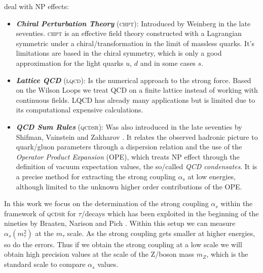 \documentclass[../../index.tex]{subfiles}
\begin{document}
deal with NP effects:
\begin{itemize}
\item \textbf{\textit{Chiral Perturbation Theory}} (\textsc{chpt}): Introduced
  by Weinberg \cite{Weinberg1978} in the late seventies. \textsc{chpt} is an
  effective field theory constructed with a Lagrangian symmetric under a
  chiral\-/transformation in the limit of massless quarks. It's limitations are
  based in the chiral symmetry, which is only a good approximation for the light
  quarks $u$, $d$ and in some cases $s$.
\item \textbf{\textit{Lattice QCD}} (\textsc{lqcd}): Is the numerical approach
  to the strong force. Based on the Wilson Loops \cite{Wilson1974} we treat QCD
  on a finite lattice instead of working with continuous fields. LQCD has
  already many applications but is limited due to its computational expensive
  calculations.
\item \textbf{\textit{QCD Sum Rules}} (\textsc{qcdsr}): Was also introduced in
  the late seventies by Shifman, Vainstein and Zakharov
  \cite{Shifman1978,Shifman1978a}. It relates the observed hadronic picture to
  quark\-/gluon parameters through a dispersion relation and the use of the
  \textit{Operator Product Expansion} (OPE), which treats NP effect through the
  definition of vacuum expectation values, the so\-/called \textit{QCD
    condensates}. It is a precise method for extracting the strong coupling
  $\alpha_s$ at low energies, although limited to the unknown higher order
  contributions of the OPE.
\end{itemize}


In this work we focus on the determination of the strong coupling $\alpha_s$
within the framework of \textsc{qcdsr} for $\tau$\-/decays which has been
exploited in the beginning of the nineties by Braaten, Narison and Pich
\cite{Braaten1991}. Within this setup we can measure $\alpha_s(m_\tau^2)$ at the
$m_\tau$ scale. As the strong coupling gets smaller at higher energies, so do
the errors. Thus if we obtain the strong coupling at a low scale we will obtain
high precision values at the scale of the Z\-/boson mass $m_Z$, which is the
standard scale to compare $\alpha_s$ values.
\end{document}
